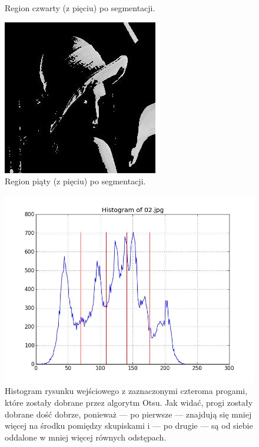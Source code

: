 \documentclass[10pt]{llncs}
\begin{document}
\begin{figure}[!htb]
  \caption{Region czwarty (z pięciu) po segmentacji.}\label{fig:8}
\endminipage\hfill
{}
  \includegraphics[width=\linewidth]{img/02_region_05.jpg}
  \caption{Region piąty (z pięciu) po segmentacji.}\label{fig:9}
\endminipage
\end{figure}

\begin{figure}[h!]
  \centering
  \includegraphics[scale=.3, clip]{img/02_histogram.jpg}
	\caption[]
  {Histogram rysunku wejściowego z zaznaczonymi czteroma progami, które zostały dobrane przez algorytm Otsu. Jak widać, progi zostały dobrane dość dobrze, ponieważ --- po pierwsze --- znajdują się mniej więcej na środku pomiędzy skupiskami i --- po drugie --- są od siebie oddalone w mniej więcej równych odstępach.}
\end{figure}
\end{document}
